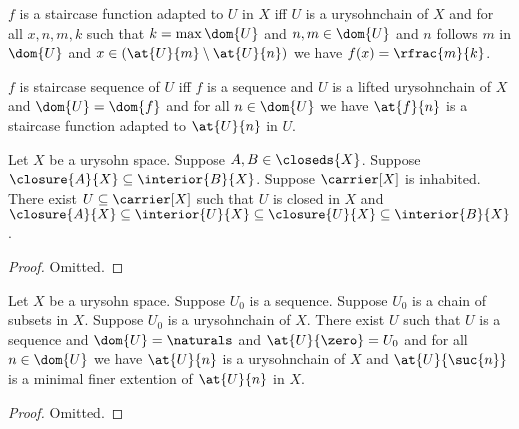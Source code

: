 \begin{definition}\label{staircase}
    $f$ is a staircase function adapted to $U$ in $X$ iff $U$ is a urysohnchain of $X$ and for all $x,n,m,k$ such that $k = \max{\dom{U}}$ and $n,m \in \dom{U}$ and $n$ follows $m$ in $\dom{U}$ and $x \in (\at{U}{m} \setminus \at{U}{n})$ we have $f(x)= \rfrac{m}{k}$.
\end{definition}

\begin{definition}\label{staircase_sequence}
    $f$ is staircase sequence of $U$ iff $f$ is a sequence and $U$ is a lifted urysohnchain of $X$ and $\dom{U} = \dom{f}$ and for all $n \in \dom{U}$ we have $\at{f}{n}$ is a staircase function adapted to $\at{U}{n}$ in $U$.
\end{definition}





\begin{theorem}\label{urysohnsetinbeetween}
    Let $X$ be a urysohn space.
    Suppose $A,B \in \closeds{X}$.
    Suppose $\closure{A}{X} \subseteq \interior{B}{X}$.
    Suppose $\carrier[X]$ is inhabited.
    There exist $U \subseteq \carrier[X]$ such that $U$ is closed in $X$ and $\closure{A}{X} \subseteq \interior{U}{X} \subseteq \closure{U}{X} \subseteq \interior{B}{X}$.
\end{theorem}
\begin{proof}
    Omitted.
\end{proof}


\begin{theorem}\label{induction_on_urysohnchains}
    Let $X$ be a urysohn space.
    Suppose $U_0$ is a sequence.
    Suppose $U_0$ is a chain of subsets in $X$.
    Suppose $U_0$ is a urysohnchain of $X$.
    There exist $U$ such that $U$ is a sequence and $\dom{U} = \naturals$ and $\at{U}{\zero} = U_0$ and for all $n \in \dom{U}$ we have $\at{U}{n}$ is a urysohnchain of $X$ and $\at{U}{\suc{n}}$ is a minimal finer extention of $\at{U}{n}$ in $X$.
\end{theorem}
\begin{proof}
    Omitted.
\end{proof}





